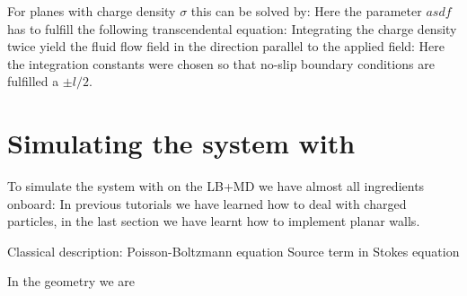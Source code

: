 For planes with charge density $\sigma$ this can be solved by:
Here the parameter $asdf$ has to fulfill the following transcendental
equation:
Integrating the charge density twice yield the fluid flow field
in the direction parallel to the applied field:
Here the integration constants were chosen so that no-slip boundary
conditions are fulfilled a $\pm l/2$.
\section{Simulating the system with \ES{}}
To simulate the system with on the LB+MD we have almost all
ingredients onboard: In previous tutorials we have learned how
to deal with charged particles, in the last section
we have learnt how to implement planar walls.



Classical description:
Poisson-Boltzmann equation
Source term in Stokes equation

In the geometry we are 

